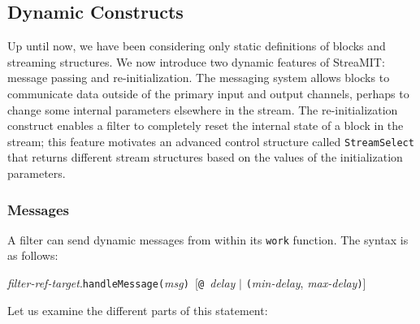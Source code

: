 \subsection{Dynamic Constructs}
\protect\label{sec:dynamic}

Up until now, we have been considering only static definitions of
blocks and streaming structures.  We now introduce two dynamic
features of StreaMIT: message passing and re-initialization.  The
messaging system allows blocks to communicate data outside of the
primary input and output channels, perhaps to change some internal
parameters elsewhere in the stream.  The re-initialization construct
enables a filter to completely reset the internal state of a block in
the stream; this feature motivates an advanced control structure
called {\tt StreamSelect} that returns different stream structures
based on the values of the initialization parameters.

\subsubsection{Messages}

A filter can send dynamic messages from within its {\tt work}
function.  The syntax is as follows:

\medskip
{\it filter-ref-target}.{\tt handleMessage(}{\it msg}{\tt) }[{\tt @ }{\it delay} $|$ {\tt (}{\it min-delay}, {\it max-delay}{\tt )}]
\medskip

Let us examine the different parts of this statement:

